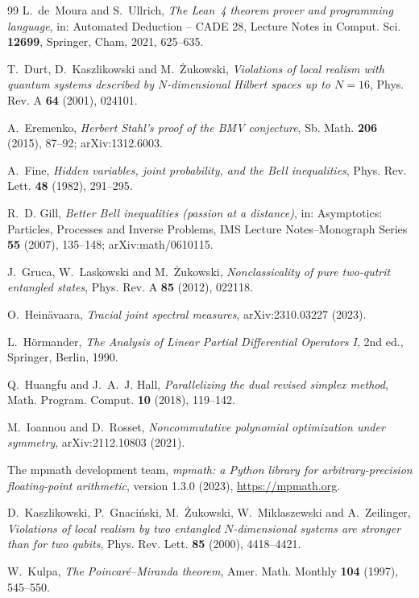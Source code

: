 \documentclass[11pt]{article}
\theoremstyle{remark}
\numberwithin{equation}{section}
\begin{document}
\begin{thebibliography}{99}
L.~de~Moura and S.~Ullrich, \emph{The Lean~4 theorem prover and programming language}, in: Automated Deduction -- CADE
28, Lecture Notes in Comput. Sci. \textbf{12699}, Springer, Cham, 2021, 625--635.

T.~Durt, D.~Kaszlikowski and M.~\.Zukowski, \emph{Violations of local realism with quantum systems described by
$N$-dimensional Hilbert spaces up to $N=16$}, Phys. Rev. A \textbf{64} (2001), 024101.

A.~Eremenko, \emph{Herbert Stahl's proof of the BMV conjecture}, Sb. Math. \textbf{206} (2015), 87--92;
arXiv:1312.6003.

A.~Fine, \emph{Hidden variables, joint probability, and the Bell inequalities}, Phys. Rev. Lett. \textbf{48} (1982),
291--295.

R.~D. Gill, \emph{Better Bell inequalities (passion at a distance)}, in: Asymptotics: Particles, Processes and Inverse
Problems, IMS Lecture Notes--Monograph Series \textbf{55} (2007), 135--148; arXiv:math/0610115.

J.~Gruca, W.~Laskowski and M.~\.Zukowski, \emph{Nonclassicality of pure two-qutrit entangled states}, Phys. Rev. A
\textbf{85} (2012), 022118.

O.~Hein\"avaara, \emph{Tracial joint spectral measures}, arXiv:2310.03227 (2023).

L.~H\"ormander, \emph{The Analysis of Linear Partial Differential Operators I}, 2nd ed., Springer, Berlin, 1990.

Q.~Huangfu and J.~A.~J. Hall, \emph{Parallelizing the dual revised simplex method}, Math. Program. Comput. \textbf{10}
(2018), 119--142.

M.~Ioannou and D.~Rosset, \emph{Noncommutative polynomial optimization under symmetry}, arXiv:2112.10803 (2021).

The mpmath development team, \emph{mpmath: a Python library for arbitrary-precision floating-point arithmetic}, version
1.3.0 (2023), \url{https://mpmath.org}.

D.~Kaszlikowski, P.~Gnaci\'nski, M.~\.Zukowski, W.~Miklaszewski and A.~Zeilinger, \emph{Violations of local realism by
two entangled $N$-dimensional systems are stronger than for two qubits}, Phys. Rev. Lett. \textbf{85} (2000), 4418--4421.

W.~Kulpa, \emph{The Poincar\'e--Miranda theorem}, Amer. Math. Monthly \textbf{104} (1997), 545--550.


\end{thebibliography}
\end{document}
